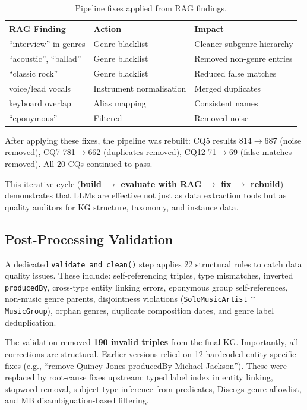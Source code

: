 \documentclass[11pt,a4paper]{article}
\begin{document}
\begin{table}[h]
\centering
\small
\begin{tabular}{llp{4cm}}
\toprule
\textbf{RAG Finding} & \textbf{Action} & \textbf{Impact} \\
\midrule
``interview'' in genres & Genre blacklist & Cleaner subgenre hierarchy \\
``acoustic'', ``ballad'' & Genre blacklist & Removed non-genre entries \\
``classic rock'' & Genre blacklist & Reduced false matches \\
voice/lead vocals & Instrument normalisation & Merged duplicates \\
keyboard overlap & Alias mapping & Consistent names \\
``eponymous'' & Filtered & Removed noise \\
\bottomrule
\end{tabular}
\caption{Pipeline fixes applied from RAG findings.}
\end{table}

After applying these fixes, the pipeline was rebuilt: CQ5 results 814$\rightarrow$687 (noise removed), CQ7 781$\rightarrow$662 (duplicates removed), CQ12 71$\rightarrow$69 (false matches removed). All 20 CQs continued to pass.

This iterative cycle (\textbf{build $\rightarrow$ evaluate with RAG $\rightarrow$ fix $\rightarrow$ rebuild}) demonstrates that LLMs are effective not just as data extraction tools but as quality auditors for KG structure, taxonomy, and instance data.

\subsection{Post-Processing Validation}

A dedicated \texttt{validate\_and\_clean()} step applies 22 structural rules to catch data quality issues. These include: self-referencing triples, type mismatches, inverted \texttt{producedBy}, cross-type entity linking errors, eponymous group self-references, non-music genre parents, disjointness violations (\texttt{SoloMusicArtist} $\cap$ \texttt{MusicGroup}), orphan genres, duplicate composition dates, and genre label deduplication.

The validation removed \textbf{190 invalid triples} from the final KG. Importantly, all corrections are structural. Earlier versions relied on 12 hardcoded entity-specific fixes (e.g., ``remove Quincy Jones producedBy Michael Jackson''). These were replaced by root-cause fixes upstream: typed label index in entity linking, stopword removal, subject type inference from predicates, Discogs genre allowlist, and MB disambiguation-based filtering.
\end{document}

